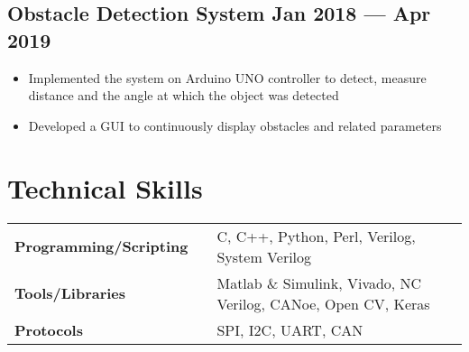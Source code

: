 \documentclass[a4,10pt]{article}
\newenvironment{zitemize}{
\begin{itemize}\itemsep0pt \parskip0pt \parsep1pt}
{\end{itemize}\vspace{-0.5cm}}
\newcommand{\hskills}[1]{
\textbf{\bfseries #1} }
\begin{document}
\subsection*{Obstacle Detection System \hfill Jan 2018 --- Apr 2019} 
    \begin{zitemize}
        \item Implemented the system on Arduino UNO controller to detect, measure distance and the angle at which the object was detected
        \item Developed a GUI to continuously display obstacles and related parameters
    \end{zitemize}









\section{Technical Skills}
\begin{tabular}{p{11em} p{1em} p{43em}}
\hskills{Programming/Scripting }&  &  C, C++, Python, Perl, Verilog, System Verilog \\
\hskills{Tools/Libraries} &  & Matlab \& Simulink, Vivado, NC Verilog, CANoe, Open CV, Keras \\
\hskills{Protocols} &  & SPI, I2C, UART, CAN \\
\end{tabular}
\vspace{-0.2cm}




\end{document}
